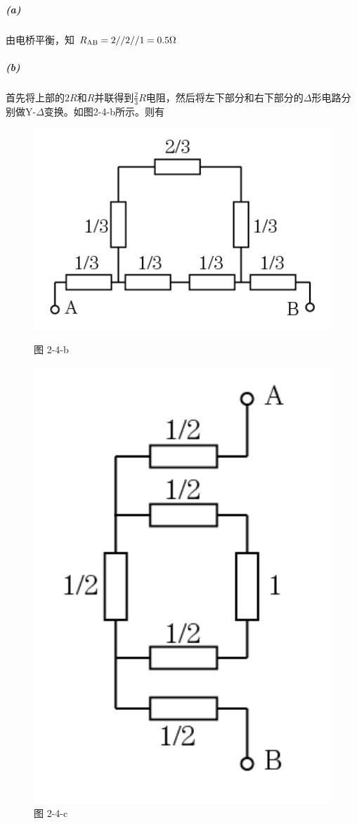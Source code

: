 \documentclass[hyperref, UTF8]{ctexart}
\begin{document}
\subparagraph{(a)}
由电桥平衡，知
$R_{\rm AB}=2//2//1=0.5\Omega$
\subparagraph{(b)}
首先将上部的$2R$和$R$并联得到$\frac{2}{3}R$电阻，然后将左下部分和右下部分的$\Delta$形电路分别做Y-$\Delta$变换。如图2-4-b所示。则有
\begin{figure}[!htb]
  \centering
  \begin{minipage}[t]{0.255\textwidth}
    \centering
    \includegraphics[width=1\textwidth]{p2-4-b-sol.png}
    \caption*{图 2-4-b}
  \end{minipage}
  \begin{minipage}[t]{0.173\textwidth}
    \centering
    \includegraphics[width=1\textwidth]{p2-4-c-sol.png}
    \caption*{图 2-4-c}
  \end{minipage}
\end{figure}
\end{document}
